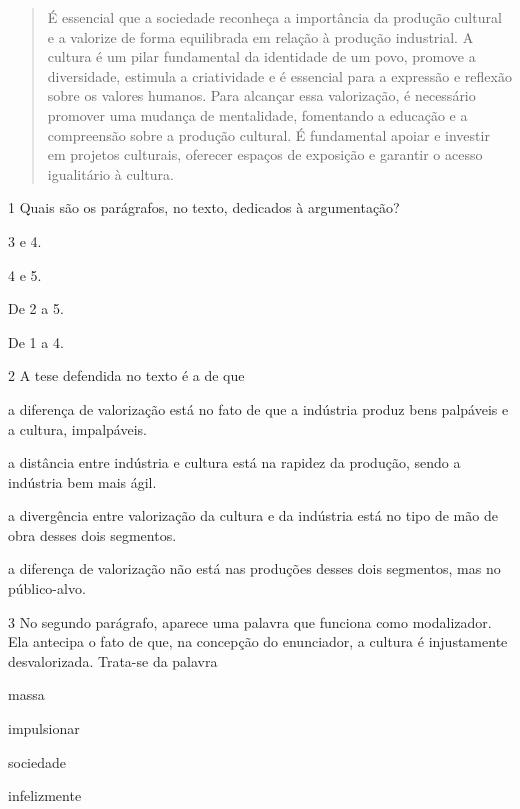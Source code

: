 \begin{quote}
É essencial que a sociedade reconheça a importância da produção cultural
e a valorize de forma equilibrada em relação à produção industrial. A
cultura é um pilar fundamental da identidade de um povo, promove a
diversidade, estimula a criatividade e é essencial para a expressão e
reflexão sobre os valores humanos. Para alcançar essa valorização, é
necessário promover uma mudança de mentalidade, fomentando a educação e
a compreensão sobre a produção cultural. É fundamental apoiar e investir
em projetos culturais, oferecer espaços de exposição e garantir o acesso
igualitário à cultura.
\end{quote}

\num{1} Quais são os parágrafos, no texto, dedicados à argumentação?

\begin{escolha}
\item
  3 e 4.
\item
  4 e 5.
\item
  De 2 a 5.
\item
  De 1 a 4.
\end{escolha}

\pagebreak
\num{2} A tese defendida no texto é a de que

\begin{escolha}
\item
  a diferença de valorização está no fato de que a indústria produz bens
  palpáveis e a cultura, impalpáveis.
\item
  a distância entre indústria e cultura está na rapidez da produção,
  sendo a indústria bem mais ágil.
\item
  a divergência entre valorização da cultura e da indústria está no tipo
  de mão de obra desses dois segmentos.
\item
  a diferença de valorização não está nas produções desses dois
  segmentos, mas no público-alvo.
\end{escolha}

\num{3} No segundo parágrafo, aparece uma palavra que funciona como
modalizador. Ela antecipa o fato de que, na concepção do enunciador, a
cultura é injustamente desvalorizada. Trata-se da palavra

\begin{escolha}
\item
  massa
\item
  impulsionar
\item
  sociedade
\item
  infelizmente
\end{escolha}


